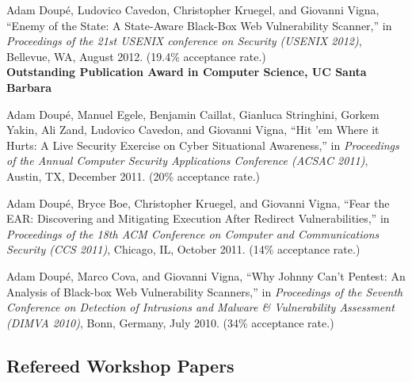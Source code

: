 \documentclass[11pt,letterpaper,sans]{moderncv}
\begin{document}
\begin{etaremune}
\item Adam Doup\'e, Ludovico Cavedon, Christopher Kruegel,
  and Giovanni Vigna, ``Enemy of the State: A State-Aware Black-Box
  Web Vulnerability Scanner,'' in \emph{Proceedings of the 21st USENIX
    conference on Security (USENIX 2012)}, Bellevue, WA, August 2012.
  (19.4\% acceptance rate.) \\
  \textbf{Outstanding Publication Award in Computer
  Science, UC Santa Barbara}

\item Adam Doup\'e, Manuel Egele, Benjamin Caillat, Gianluca
  Stringhini, Gorkem Yakin, Ali Zand, Ludovico Cavedon, and Giovanni
  Vigna, ``Hit 'em Where it Hurts: A Live Security Exercise on Cyber
  Situational Awareness,'' in \emph{Proceedings of the Annual Computer
    Security Applications Conference (ACSAC 2011)}, Austin, TX,
  December 2011. (20\% acceptance rate.)

\item Adam Doup\'e, Bryce Boe, Christopher Kruegel, and
  Giovanni Vigna, ``Fear the EAR: Discovering and Mitigating Execution
  After Redirect Vulnerabilities,'' in \emph{Proceedings of the 18th
    ACM Conference on Computer and Communications Security (CCS
    2011)}, Chicago, IL, October 2011. (14\% acceptance rate.)

\item Adam Doup\'e, Marco Cova, and Giovanni Vigna, ``Why
  Johnny Can't Pentest: An Analysis of Black-box Web Vulnerability
  Scanners,'' in \emph{Proceedings of the Seventh Conference on
    Detection of Intrusions and Malware \& Vulnerability Assessment
    (DIMVA 2010)}, Bonn, Germany, July 2010. (34\% acceptance rate.)
  
\end{etaremune}

\subsection{Refereed Workshop Papers}
\end{document}
